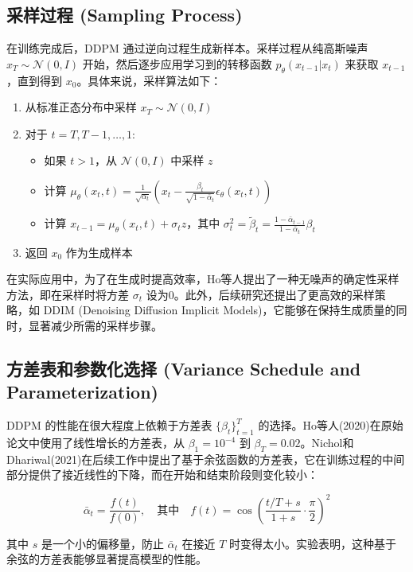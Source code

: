 \documentclass{ctexart}
\begin{document}
\subsection{采样过程 (Sampling Process)}
\noindent
在训练完成后，DDPM 通过逆向过程生成新样本。采样过程从纯高斯噪声 $x_T \sim \mathcal{N}(0, I)$ 开始，然后逐步应用学习到的转移函数 $p_\theta(x_{t-1} | x_t)$ 来获取 $x_{t-1}$，直到得到 $x_0$。具体来说，采样算法如下：

\begin{enumerate}
    \item 从标准正态分布中采样 $x_T \sim \mathcal{N}(0, I)$
    \item 对于 $t = T, T-1, \dots, 1$:
    \begin{itemize}
        \item 如果 $t > 1$，从 $\mathcal{N}(0, I)$ 中采样 $z$
        \item 计算 $\mu_\theta(x_t, t) = \frac{1}{\sqrt{\alpha_t}}\left(x_t - \frac{\beta_t}{\sqrt{1-\bar{\alpha}_t}}\epsilon_\theta(x_t, t)\right)$
        \item 计算 $x_{t-1} = \mu_\theta(x_t, t) + \sigma_t z$，其中 $\sigma_t^2 = \tilde{\beta}_t = \frac{1-\bar{\alpha}_{t-1}}{1-\bar{\alpha}_t}\beta_t$
    \end{itemize}
    \item 返回 $x_0$ 作为生成样本
\end{enumerate}

\noindent
在实际应用中，为了在生成时提高效率，Ho等人提出了一种无噪声的确定性采样方法，即在采样时将方差 $\sigma_t$ 设为0。此外，后续研究还提出了更高效的采样策略，如 DDIM (Denoising Diffusion Implicit Models)，它能够在保持生成质量的同时，显著减少所需的采样步骤。

\subsection{方差表和参数化选择 (Variance Schedule and Parameterization)}
\noindent
DDPM 的性能在很大程度上依赖于方差表 $\{\beta_t\}_{t=1}^T$ 的选择。Ho等人(2020)在原始论文中使用了线性增长的方差表，从 $\beta_1 = 10^{-4}$ 到 $\beta_T = 0.02$。Nichol和Dhariwal(2021)在后续工作中提出了基于余弦函数的方差表，它在训练过程的中间部分提供了接近线性的下降，而在开始和结束阶段则变化较小：

$$ \bar{\alpha}_t = \frac{f(t)}{f(0)}, \quad \text{其中} \quad f(t) = \cos\left(\frac{t/T + s}{1 + s} \cdot \frac{\pi}{2}\right)^2 $$

\noindent
其中 $s$ 是一个小的偏移量，防止 $\bar{\alpha}_t$ 在接近 $T$ 时变得太小。实验表明，这种基于余弦的方差表能够显著提高模型的性能。
\end{document}
